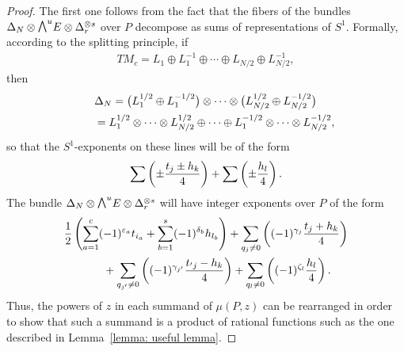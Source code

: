 \documentclass[10pt,a4paper]{amsart}
\newcommand{\ext}{\raise1pt\hbox{$\textstyle\bigwedge$}}
\numberwithin{equation}{section}
\begin{document}
\begin{proof}
The f\/irst one follows from the fact that the f\/ibers of the bundles $\Delta_N\otimes \ext^uE\otimes \Delta_r^{\otimes s}$ over $P$ decompose as sums of representations of $S^1$. Formally, according to the splitting principle, if
\begin{gather*}
TM_c= L_1\oplus L_1^{-1}\oplus\cdots\oplus L_{N/2}\oplus L_{N/2}^{-1},
\end{gather*}
then
\begin{gather*}
\Delta_N= \big(L_1^{1/2}\oplus L_1^{-1/2}\big)\otimes\cdots \otimes\big(L_{N/2}^{1/2}\oplus L_{N/2}^{-1/2}\big)\\
\hphantom{\Delta_N}{} = L_1^{1/2}\otimes\cdots\otimes L_{N/2}^{1/2}\oplus\cdots\oplus L_1^{-1/2}\otimes\cdots\otimes L_{N/2}^{-1/2},
\end{gather*}
so that the $S^1$-exponents on these lines will be of the form
\begin{gather*}\sum \left(\pm{t_j\pm h_k\over 4}\right) + \sum \left(\pm{h_l\over 4}\right).\end{gather*}
The bundle $\Delta_N\otimes \ext^uE\otimes \Delta_r^{\otimes s}$ will have integer exponents over $P$ of the form
\begin{gather*}
{1\over 2}\left(\sum_{a=1}^c (-1)^{\varepsilon_a}t_{i_a}+\sum_{b=1}^s (-1)^{\delta_b}h_{l_b}\right)
+\sum_{q_j\not=0} \left((-1)^{\gamma_j}{t_j+ h_k\over 4}\right) \\
\qquad{} +\sum_{q_{j'}\not=0} \left((-1)^{\gamma_{j'}}{t_{'j}- h_k\over 4}\right)
+ \sum_{q_l\not=0} \left((-1)^{\zeta_l}{h_l\over 4}\right).
\end{gather*}
Thus, the powers of $z$ in each summand of $\mu(P,z)$ can be rearranged in order to show that such a summand is a product of rational functions
such as the one described in Lemma~\ref{lemma: useful lemma}.


\end{proof}
\end{document}
